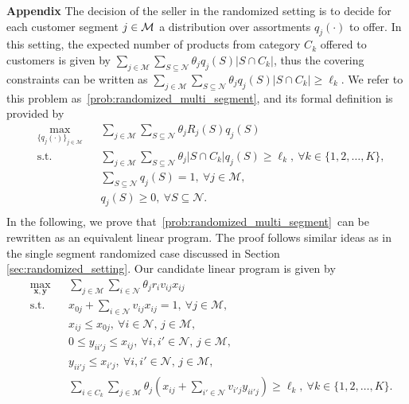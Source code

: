 \documentclass[msom,non-blindrev]{informs3} %
\theoremstyle{definition}
\begin{document}
\begin{appendices}{\Large \noindent\textbf{Appendix}}
The decision of the seller in the randomized setting is to decide for each customer segment $j \in {\cal M}$ a distribution over assortments $q_j(\cdot)$ to offer. In this setting, the expected number of products from category $C_k$ {  offered} to customers is given by $\sum_{j\in\mathcal{M}}\sum_{S\subseteq\mathcal{N}}\theta_jq_j(S)|S\cap C_k|$, thus the covering constraints can be written as $\sum_{j\in\mathcal{M}}\sum_{S\subseteq\mathcal{N}}\theta_jq_j(S)|S\cap C_k|\geq \ell_k$.
We refer to this problem as~\eqref{prob:randomized_multi_segment}, and its formal definition is provided by
\begin{equation}\tag{m-RAOC}\label{prob:randomized_multi_segment}
\begin{aligned}
&\max_{\{q_j(\cdot)\}_{j\in\mathcal{M}}}&&{\sum_{j\in\mathcal{M}}\sum_{S\subseteq\mathcal{N}}\theta_jR_j(S)q_j(S)}\\
&\text{s.t.}&&{\sum_{j\in\mathcal{M}}\sum_{S\subseteq\mathcal{N}}\theta_j|S\cap C_k|q_j(S)\geq \ell_k,\ \forall k\in\{1,2,\dots,K\},}\\
&&&{\sum_{S\subseteq\mathcal{N}}q_j(S)=1,\ \forall j\in\mathcal{M},}\\
&&&{q_j(S)\geq 0,\ \forall S\subseteq\mathcal{N}.}\\
\end{aligned}
\end{equation}
In the following, we prove that~\eqref{prob:randomized_multi_segment}~can be rewritten as an equivalent linear program. The proof follows similar ideas as in the single segment randomized case discussed in Section \ref{sec:randomized_setting}. Our candidate linear program is given by
\begin{equation}\label{prob:lp_randomized_multi_segment}\tag{m-RAOC-LP}
\begin{aligned}
&\max_{\mathbf{x},\mathbf{y}}&&{\sum_{j\in\mathcal{M}}\sum_{i\in\mathcal{N}}\theta_jr_iv_{ij}x_{ij}}\\
&\text{s.t.}&&{x_{0j}+\sum_{i\in\mathcal{N}}v_{ij}x_{ij}=1,\ \forall j\in\mathcal{M},}\\
&&&{x_{ij}\leq x_{0j},\ \forall i\in\mathcal{N},\,j\in\mathcal{M},}\\
&&&{0\leq y_{ii'j}\leq x_{ij},\ \forall i,i'\in\mathcal{N},\,j\in\mathcal{M},}\\
&&&{y_{ii'j}\leq x_{i'j},\ \forall i,i'\in\mathcal{N},\,j\in\mathcal{M},}\\
&&&{\sum_{i\in C_k}\sum_{j\in\mathcal{M}}\theta_j\left(x_{ij}+\sum_{i'\in\mathcal{N}}v_{i'j}y_{ii'j}\right)\geq \ell_k,\ \forall k\in\{1,2,\dots,K\}.}

\end{aligned}
\end{equation}
\end{appendices}
\end{document}
